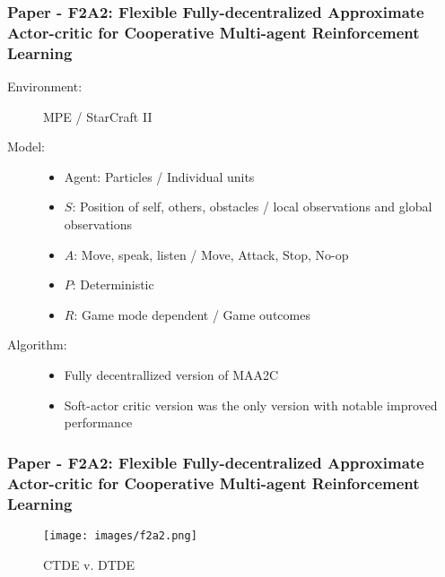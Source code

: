 \documentclass{beamer}
\begin{document}
\begin{frame} %
    \frametitle{Paper \thepapercounter - F2A2: Flexible Fully-decentralized Approximate 
    Actor-critic for Cooperative Multi-agent Reinforcement Learning}
    \begin{description}
        \item[Environment:] MPE / StarCraft II
        \item[Model:]
        \begin{itemize}
            \item Agent:  Particles / Individual units
            \item $S$: Position of self, others, obstacles / 
            local observations and global observations
            \item $A$: Move, speak, listen / Move, Attack, Stop, No-op
            \item $P$: Deterministic
            \item $R$: Game mode dependent / Game outcomes
        \end{itemize}
        \item[Algorithm:] 
        \begin{itemize}
            \item Fully decentrallized version of MAA2C
            \item Soft-actor critic version was the only version with notable improved performance
        \end{itemize}
    \end{description}
\end{frame}

\begin{frame} %
    \frametitle{Paper \thepapercounter - F2A2: Flexible Fully-decentralized Approximate 
    Actor-critic for Cooperative Multi-agent Reinforcement Learning\cite{li2023d}}
    \begin{figure}\small
        \texttt{[image: images/f2a2.png]}
        \caption{CTDE v. DTDE\cite{li2023d}}
    \end{figure}
\end{frame}
\end{document}
